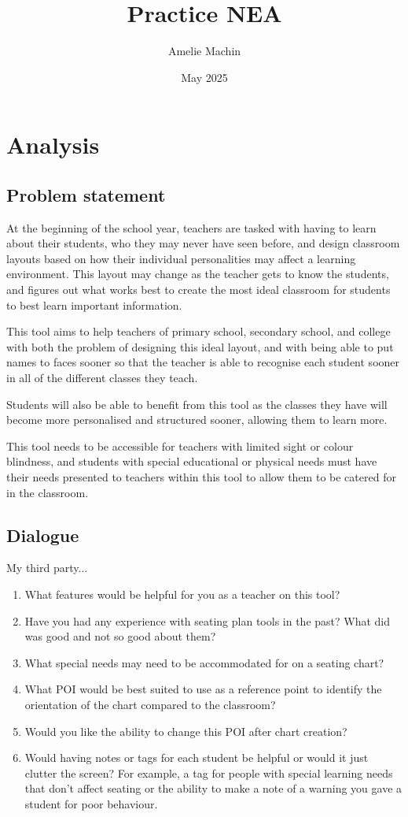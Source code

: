 \documentclass{article}
\title{Practice NEA}
\author{Amelie Machin}
\date{May 2025}
\begin{document}
\maketitle

\section{Analysis}
\subsection{Problem statement}
At the beginning of the school year, teachers are tasked with having to learn about their students, who they may never have seen before, and design classroom layouts based on how their individual personalities may affect a learning environment. This layout may change as the teacher gets to know the students, and figures out what works best to create the most ideal classroom for students to best learn important information.  

 

This tool aims to help teachers of primary school, secondary school, and college with both the problem of designing this ideal layout, and with being able to put names to faces sooner so that the teacher is able to recognise each student sooner in all of the different classes they teach.  

Students will also be able to benefit from this tool as the classes they have will become more personalised and structured sooner, allowing them to learn more. 

 

This tool needs to be accessible for teachers with limited sight or colour blindness, and students with special educational or physical needs must have their needs presented to teachers within this tool to allow them to be catered for in the classroom. 

\subsection{Dialogue}
My third party...
\begin{enumerate}
\item What features would be helpful for you as a teacher on this tool? 
\item Have you had any experience with seating plan tools in the past? What did was good and not so good about them? 
\item What special needs may need to be accommodated for on a seating chart? 
\item What POI would be best suited to use as a reference point to identify the orientation of the chart compared to the classroom?  
\item Would you like the ability to change this POI after chart creation? 
\item Would having notes or tags for each student be helpful or would it just clutter the screen? For example, a tag for people with special learning needs that don't affect seating or the ability to make a note of a warning you gave a student for poor behaviour. 
\end{enumerate}
\end{document}
